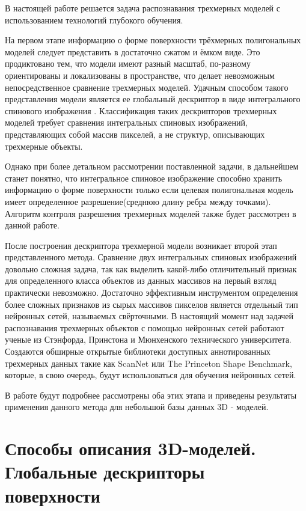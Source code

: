 \documentclass[14pt]{article}
\numberwithin{figure}{section}
\numberwithin{equation}{section}
\begin{document}
В настоящей работе решается задача распознавания трехмерных моделей с использованием технологий глубокого обучения.

На первом этапе информацию о форме поверхности трёхмерных полигональных моделей следует представить в достаточно сжатом и ёмком виде. Это продиктовано тем, что модели имеют разный масштаб, по-разному ориентированы и локализованы в пространстве, что делает невозможным непосредственное сравнение трехмерных моделей. Удачным способом такого представления модели является ее глобальный дескриптор в виде интегрального спинового изображения \cite{KCh}. Классификация таких дескрипторов трехмерных моделей требует сравнения интегральных спиновых изображений, представляющих собой массив пикселей, а не структур, описывающих трехмерные объекты.

Однако при более детальном рассмотрении поставленной задачи, в дальнейшем станет понятно, что интегральное спиновое изображение способно хранить информацию о форме поверхности только если целевая полигональная модель имеет определенное разрешение(среднюю длину ребра между точками). Алгоритм контроля разрешения трехмерных моделей также будет рассмотрен в данной работе.

После построения дескриптора трехмерной модели возникает второй этап представленного метода. Сравнение двух интегральных спиновых изображений довольно сложная задача, так как выделить какой-либо отличительный признак для определенного класса объектов из данных массивов на первый взгляд практически невозможно. Достаточно эффективным инструментом определения более сложных признаков из сырых массивов пикселов является отдельный тип нейронных сетей, называемых свёрточными. %
В настоящий момент над задачей распознавания трехмерных объектов с помощью нейронных сетей работают ученые из Стэнфорда, Принстона и Мюнхенского технического университета. Создаются обширные открытые библиотеки доступных аннотированных трехмерных данных такие как ScanNet или The Princeton Shape Benchmark\cite{PSB}, которые, в свою очередь, будут использоваться для обучения нейронных сетей.%

В работе будут подробнее рассмотрены оба этих этапа и приведены результаты применения данного метода для небольшой базы данных 3D - моделей.

\section{Способы описания 3D-моделей. Глобальные дескрипторы\\поверхности}
\end{document}
